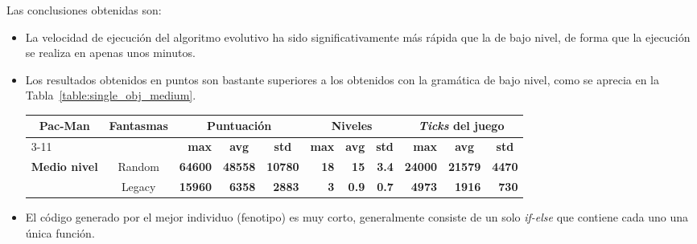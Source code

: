 Las conclusiones obtenidas son:
\begin{itemize}
\item La velocidad de ejecución del algoritmo evolutivo ha sido significativamente más rápida que la de bajo nivel, de forma que la ejecución se realiza en apenas unos minutos.

\item Los resultados obtenidos en puntos son bastante superiores a los obtenidos con la gramática de bajo nivel, como se aprecia en la Tabla~\ref{table:single_obj_medium}.

\begin{sidewaystable}[]
\centering
\begin{tabular}{|l|c|r|r|r|r|r|r|r|r|r|}
\hline
\multicolumn{1}{|c|}{\multirow{2}{*}{\textbf{Pac-Man}}} & \multirow{2}{*}{\textbf{Fantasmas}} & \multicolumn{3}{c|}{\textbf{Puntuación}} & \multicolumn{3}{c|}{\textbf{Niveles}} & \multicolumn{3}{c|}{\textbf{\textit{Ticks} del juego}} \\ \cline{3-11} 
\multicolumn{1}{|c|}{} &  & \textbf{max} & \multicolumn{1}{c|}{\textbf{avg}} & \multicolumn{1}{c|}{\textbf{std}} & \textbf{max} & \multicolumn{1}{c|}{\textbf{avg}} & \multicolumn{1}{c|}{\textbf{std}} & \textbf{max} & \multicolumn{1}{c|}{\textbf{avg}} & \multicolumn{1}{c|}{\textbf{std}} \\ \hline
\multirow{2}{*}{\textbf{Medio nivel}} & Random & \multicolumn{1}{r|}{\textbf{64600}} & \textbf{48558} & \textbf{10780} & \multicolumn{1}{r|}{\textbf{18}} & \textbf{15} & \textbf{3.4} & \multicolumn{1}{r|}{\textbf{24000}} & \textbf{21579} & \textbf{4470} \\ \cline{2-11} 
 & Legacy & \multicolumn{1}{r|}{\textbf{15960}} & \textbf{6358} & \textbf{2883} & \multicolumn{1}{r|}{\textbf{3}} & \textbf{0.9} & \textbf{0.7} & \multicolumn{1}{r|}{\textbf{4973}} & \textbf{1916} & \textbf{730} \\ \hline
\end{tabular}
\caption{Pac-Man de medio nivel contra diversos fantasmas. 1000 ejecuciones.}
\label{table:single_obj_medium}
\end{sidewaystable}

\item El código generado por el mejor individuo (fenotipo) es muy corto, generalmente consiste de un solo \textit{if-else} que contiene cada uno una única función.


\end{itemize}
